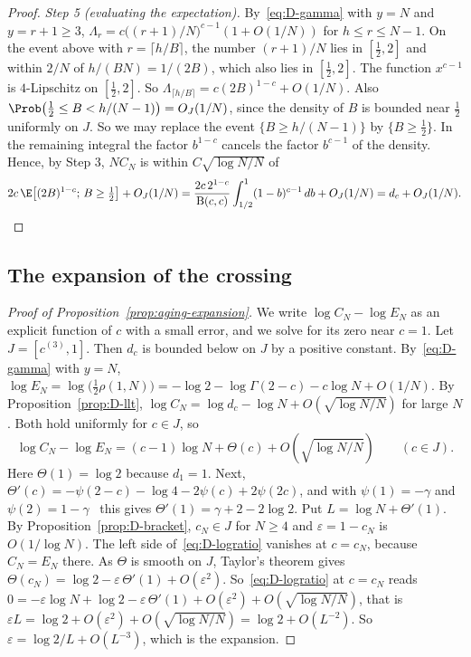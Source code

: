\begin{proof}
\emph{Step 5 (evaluating the expectation).} By~\eqref{eq:D-gamma} with $y=N$
and $y=r+1\ge3$,
$\Lambda_r=c\bigl((r+1)/N\bigr)^{c-1}(1+O(1/N))$ for $h\le r\le N-1$. On the
event above with $r=\lceil h/B\rceil$, the number $(r+1)/N$ lies in
$[\frac12,2]$ and within $2/N$ of $h/(BN)=1/(2B)$, which also lies in
$[\frac12,2]$. The function $x^{c-1}$ is $4$-Lipschitz on $[\frac12,2]$. So
$\Lambda_{\lceil h/B\rceil}=c(2B)^{1-c}+O(1/N)$. Also
$\Prob\bigl(\frac12\le B<h/(N-1)\bigr)=O_J(1/N)$, since the density of $B$ is
bounded near $\frac12$ uniformly on $J$. So we may replace the event
$\{B\ge h/(N-1)\}$ by $\{B\ge\frac12\}$. In the remaining integral the factor
$b^{1-c}$ cancels the factor $b^{c-1}$ of the density. Hence, by Step 3,
$NC_N$ is within $C\sqrt{\log N/N}$ of
\[
2c\,\E\bigl[(2B)^{1-c};\,B\ge\tfrac12\bigr]+O_J(1/N)
=\frac{2c\,2^{1-c}}{\mathrm B(c,c)}\int_{1/2}^1(1-b)^{c-1}\,db+O_J(1/N)=d_c+O_J(1/N).\qedhere
\]
\end{proof}

\subsection{The expansion of the crossing}

\begin{proof}[Proof of Proposition~\ref{prop:aging-expansion}]
We write $\log C_N-\log E_N$ as an explicit function of $c$ with a small
error, and we solve for its zero near $c=1$. Let $J=[c^{(3)},1]$. Then $d_c$ is
bounded below on $J$ by a positive constant. By~\eqref{eq:D-gamma} with
$y=N$,
$\log E_N=\log\bigl(\tfrac12\rho(1,N)\bigr)=-\log2-\log\Gamma(2-c)-c\log N+O(1/N)$.
By Proposition~\ref{prop:D-llt},
$\log C_N=\log d_c-\log N+O(\sqrt{\log N/N})$ for large $N$. Both hold uniformly for
$c\in J$, so
\begin{equation}\label{eq:D-logratio}
\log C_N-\log E_N=(c-1)\log N+\Theta(c)+O(\sqrt{\log N/N})\qquad(c\in J).
\end{equation}
Here $\Theta(1)=\log2$ because $d_1=1$. Next,
$\Theta'(c)=-\psi(2-c)-\log4-2\psi(c)+2\psi(2c)$, and with $\psi(1)=-\gamma$
and $\psi(2)=1-\gamma$~\cite[5.4.12, 5.4.14]{dlmf} this gives
$\Theta'(1)=\gamma+2-2\log2$. Put
$L=\log N+\Theta'(1)$. By Proposition~\ref{prop:D-bracket}, $c_N\in J$ for
$N\ge4$ and $\varepsilon=1-c_N$ is $O(1/\log N)$. The left side
of~\eqref{eq:D-logratio} vanishes at $c=c_N$, because $C_N=E_N$ there. As
$\Theta$ is smooth on $J$, Taylor's theorem gives
$\Theta(c_N)=\log2-\varepsilon\,\Theta'(1)+O(\varepsilon^2)$.
So~\eqref{eq:D-logratio} at $c=c_N$ reads
$0=-\varepsilon\log N+\log2-\varepsilon\,\Theta'(1)+O(\varepsilon^2)+O(\sqrt{\log N/N})$,
that is
$\varepsilon L=\log2+O(\varepsilon^2)+O(\sqrt{\log N/N})=\log2+O(L^{-2})$. So
$\varepsilon=\log2/L+O(L^{-3})$, which is the expansion.
\end{proof}

